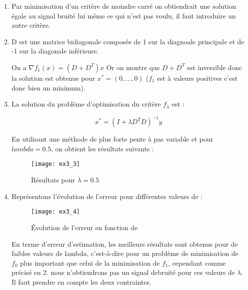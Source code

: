\documentclass[12pt,a4paper,titlepage]{article}
\begin{document}
\begin{enumerate}

    \item{Par minimisation d'un critère de moindre carré on obtiendrait une solution
            égale au signal bruité lui même ce qui n'est pas voulu, il faut introduire
            un autre critère.
        }

    \item{D est une matrice bidiagonale composée de 1 sur la diagnoale principale et
            de -1 sur la diagonale inférieure.

            On a $\nabla f_1(x) = (D + D^T)x$ Or on montre que $D + D^T$ est inversible
            donc la solution est obtenue pour $x^* = (0, \dots, 0)$ ($f_1$ est à valeurs
            positives c'est donc bien un minimum).
        }

    \item{La solution du problème d'optimisation du critère $f_\lambda$ est : 

            $$x^* = (I + \lambda D^T D)^{-1}y$$

            En utilisant une méthode de plus forte pente à pas variable et pour
            $lambda = 0.5$, on obtient les résultats suivants :

            \begin{figure}[H]
                \centering
                \texttt{[image: ex3\_3]}
                \caption{Résultats pour $\lambda = 0.5$}
            \end{figure}
        }

    \item{
            Représentons l'évolution de l'erreur pour différentes valeurs de \lambda :

            \begin{figure}[H]
                \centering
                \texttt{[image: ex3\_4]}
                \caption{Évolution de l'erreur en fonction de \lambda}
            \end{figure}

            En terme d'erreur d'estimation, les meilleurs résultats sont obtenus pour
            de faibles valeurs de lambda, c'est-à-dire pour un problème de minimisation
            de $f_0$ plus important que celui de la minimisation de $f_1$, cependant
            comme précisé en 2. nous n'obtiendrons pas un signal debruité pour ces
            valeurs de $\lambda$. Il faut prendre en compte les deux contraintes.
        }


\end{enumerate}
\end{document}
